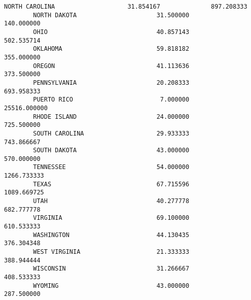 \documentclass[11pt]{article}
\begin{document}
\begin{Verbatim}[commandchars=\\\{\}]
        NORTH CAROLINA                    31.854167              897.208333   
        NORTH DAKOTA                      31.500000              140.000000   
        OHIO                              40.857143              502.535714   
        OKLAHOMA                          59.818182              355.000000   
        OREGON                            41.113636              373.500000   
        PENNSYLVANIA                      20.208333              693.958333   
        PUERTO RICO                        7.000000            25516.000000   
        RHODE ISLAND                      24.000000              725.500000   
        SOUTH CAROLINA                    29.933333              743.866667   
        SOUTH DAKOTA                      43.000000              570.000000   
        TENNESSEE                         54.000000             1266.733333   
        TEXAS                             67.715596             1089.669725   
        UTAH                              40.277778              682.777778   
        VIRGINIA                          69.100000              610.533333   
        WASHINGTON                        44.130435              376.304348   
        WEST VIRGINIA                     21.333333              388.944444   
        WISCONSIN                         31.266667              408.533333   
        WYOMING                           43.000000              287.500000   
        

\end{Verbatim}
\end{document}
